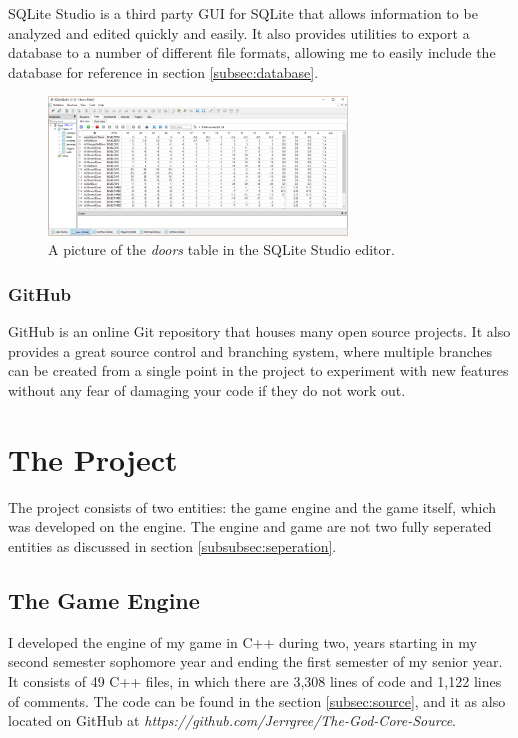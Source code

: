 \documentclass{article}
\begin{document}
SQLite Studio is a third party GUI for SQLite that allows information to be analyzed and edited quickly and easily. It also provides utilities to export a database to a number of different file formats, allowing me to easily include the database for reference in section \ref{subsec:database}.

\begin{figure}[H]
	\includegraphics[width=300px]{sqlstudio}
	\caption{A picture of the \emph{doors} table in the SQLite Studio editor.}
	\label{fig:sqlstudio}
\end{figure}

\subsubsection{GitHub} \label{subsubsec:Github}

GitHub is an online Git repository that houses many open source projects. It also provides a great source control and branching system, where multiple branches can be created from a single point in the project to experiment with new features without any fear of damaging your code if they do not work out.

\section{The Project} \label{sec:game}

The project consists of two entities: the game engine and the game itself, which was developed on the engine. The engine and game are not two fully seperated entities as discussed in section \ref{subsubsec:seperation}.

\subsection{The Game Engine} \label{subsec:engine}

I developed the engine of my game in C++ during two, years starting in my second semester sophomore year and ending the first semester of my senior year. It consists of 49 C++ files, in which there are 3,308 lines of code and 1,122 lines of comments. The code can be found in the section \ref{subsec:source}, and it as also located on GitHub at \emph{https://github.com/Jerrgree/The-God-Core-Source}.
\end{document}

